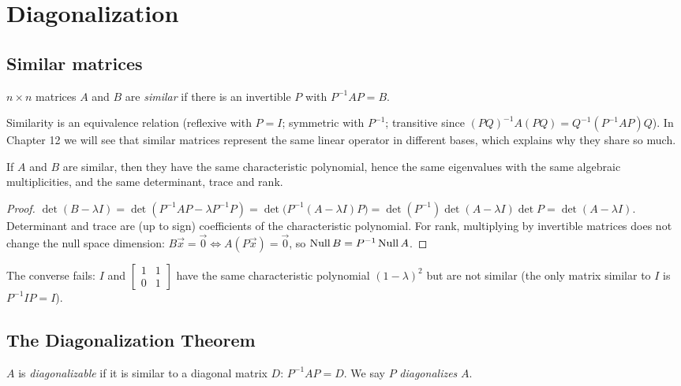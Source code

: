 \chapter{Diagonalization}

\section{Similar matrices}

\begin{definition}
$n\times n$ matrices $A$ and $B$ are \emph{similar} if there is an invertible $P$ with $P^{-1}AP=B$.
\end{definition}

Similarity is an equivalence relation (reflexive with $P=I$; symmetric with $P^{-1}$; transitive since
$(PQ)^{-1}A(PQ)=Q^{-1}(P^{-1}AP)Q$). In Chapter 12 we will see that similar matrices represent the same
linear operator in different bases, which explains why they share so much.

\begin{theorem}
If $A$ and $B$ are similar, then they have the same characteristic polynomial, hence the same eigenvalues
with the same algebraic multiplicities, and the same determinant, trace and rank.
\end{theorem}
\begin{proof}
$\det(B-\lambda I)=\det(P^{-1}AP-\lambda P^{-1}P)=\det\big(P^{-1}(A-\lambda I)P\big)
=\det(P^{-1})\det(A-\lambda I)\det P=\det(A-\lambda I)$. Determinant and trace are (up to sign) coefficients of
the characteristic polynomial. For rank, multiplying by invertible matrices does not change the null space
dimension: $B\vec x=\vec 0\iff A(P\vec x)=\vec0$, so $\operatorname{Null} B=P^{-1}\operatorname{Null} A$.
\end{proof}

\begin{important}[Pitfall]
The converse fails: $I$ and $\begin{bmatrix}1&1\\0&1\end{bmatrix}$ have the same characteristic polynomial
$(1-\lambda)^2$ but are not similar (the only matrix similar to $I$ is $P^{-1}IP=I$).
\end{important}

\section{The Diagonalization Theorem}

\begin{definition}
$A$ is \emph{diagonalizable} if it is similar to a diagonal matrix $D$: $P^{-1}AP=D$. We say $P$
\emph{diagonalizes} $A$.
\end{definition}

